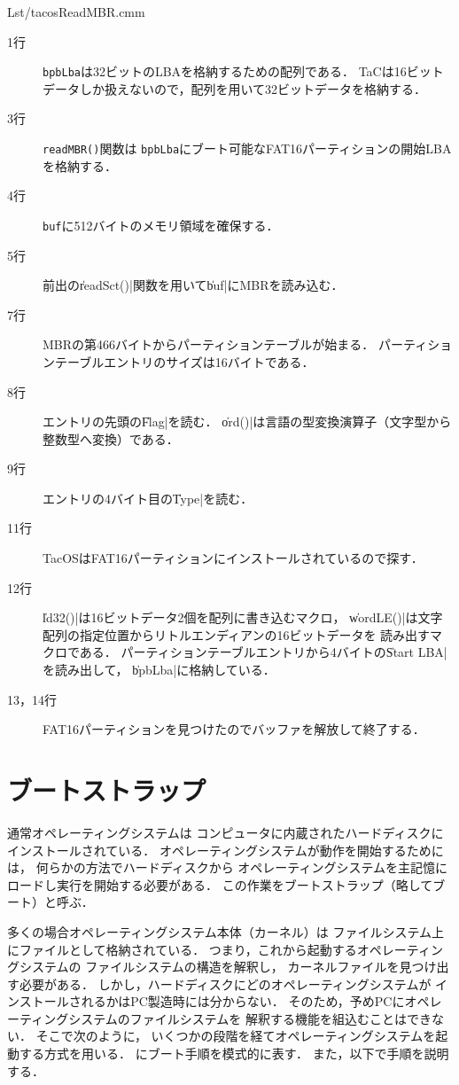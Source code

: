
                {Lst/tacosReadMBR.cmm}

\begin{description}
\item[1行] \texttt{bpbLba}は32ビットのLBAを格納するための配列である．
  TaCは16ビットデータしか扱えないので，配列を用いて32ビットデータを格納する．
\item[3行] \texttt{readMBR()}関数は
  \texttt{bpbLba}にブート可能なFAT16パーティションの開始LBAを格納する．
\item[4行] \texttt{buf}に512バイトのメモリ領域を確保する．
\item[5行] 前出の\|readSct()|関数を用いて\|buf|にMBRを読み込む．
\item[7行] MBRの第466バイトからパーティションテーブルが始まる．
  パーティションテーブルエントリのサイズは16バイトである．
\item[8行] エントリの先頭の\|Flag|を読む．
  \|ord()|は\cmm 言語の型変換演算子（文字型から整数型へ変換）である．
\item[9行] エントリの4バイト目の\|Type|を読む．
\item[11行] TacOSはFAT16パーティションにインストールされているので探す．
\item[12行] \|ld32()|は16ビットデータ2個を配列に書き込むマクロ，
  \|wordLE()|は文字配列の指定位置からリトルエンディアンの16ビットデータを
  読み出すマクロである．
  パーティションテーブルエントリから4バイトの\|Start LBA|を読み出して，
  \|bpbLba|に格納している．
\item[13，14行] FAT16パーティションを見つけたのでバッファを解放して終了する．
\end{description}

\section{ブートストラップ}
通常オペレーティングシステムは
コンピュータに内蔵されたハードディスクにインストールされている．
オペレーティングシステムが動作を開始するためには，
何らかの方法でハードディスクから
オペレーティングシステムを主記憶にロードし実行を開始する必要がある．
この作業をブートストラップ（略してブート）と呼ぶ．

多くの場合オペレーティングシステム本体（カーネル）は
ファイルシステム上にファイルとして格納されている．
つまり，これから起動するオペレーティングシステムの
ファイルシステムの構造を解釈し，
カーネルファイルを見つけ出す必要がある．
しかし，ハードディスクにどのオペレーティングシステムが
インストールされるかはPC製造時には分からない．
そのため，予めPCにオペレーティングシステムのファイルシステムを
解釈する機能を組込むことはできない．
そこで次のように，
いくつかの段階を経てオペレーティングシステムを起動する方式を用いる．
にブート手順を模式的に表す．
また，以下で手順を説明する．

